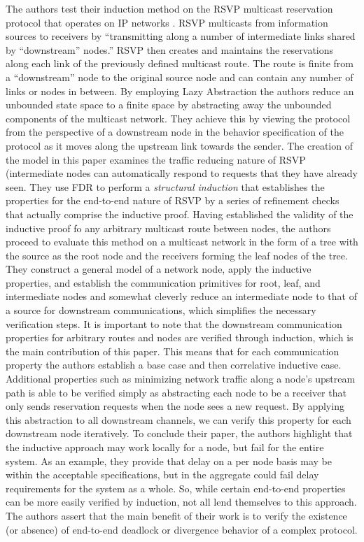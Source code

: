 \documentclass[12pt, fullpage]{article}
\begin{document}
\bigbreak
The authors test their induction method on the RSVP multicast reservation protocol that operates on IP networks \cite{rfc2205}. RSVP multicasts from information sources to receivers by ``transmitting along a number of intermediate links shared by ``downstream'' nodes.'' RSVP then creates and maintains the reservations along each link of the previously defined multicast route. The route is finite from a ``downstream'' node to the original source node and can contain any number of links or nodes in between.
\bigbreak
By employing Lazy Abstraction the authors reduce an unbounded state space to a finite space by abstracting away the unbounded components of the multicast network. They achieve this by viewing the protocol from the perspective of a downstream node in the behavior specification of the protocol as it moves along the upstream link towards the sender.
\bigbreak
The creation of the model in this paper examines the traffic reducing nature of RSVP (intermediate nodes can automatically respond to requests that they have already seen. They use FDR to perform a \textit{structural induction} that establishes the properties for the end-to-end nature of RSVP by a series of refinement checks that actually comprise the inductive proof. Having established the validity of the inductive proof fo any arbitrary multicast route between nodes, the authors proceed to evaluate this method on a multicast network in the form of a tree with the source as the root node and the receivers forming the leaf nodes of the tree. They construct a general model of a network node, apply the inductive properties, and establish the communication primitives for root, leaf, and intermediate nodes and somewhat cleverly reduce an intermediate node to that of a source for downstream communications, which simplifies the necessary verification steps. It is important to note that the downstream communication properties for arbitrary routes and nodes are verified through induction, which is the main contribution of this paper. This means that for each communication property the authors establish a base case and then correlative inductive case. Additional properties such as minimizing network traffic along a node's upstream path is able to be verified simply as abstracting each node to be a receiver that only sends reservation requests when the node sees a new request. By applying this abstraction to all downstream channels, we can verify this property for each downstream node iteratively.
\bigbreak
To conclude their paper, the authors highlight that the inductive approach may work locally for a node, but fail for the entire system. As an example, they provide that delay on a per node basis may be within the acceptable specifications, but in the aggregate could fail delay requirements for the system as a whole. So, while certain end-to-end properties can be more easily verified by induction, not all lend themselves to this approach. The authors assert that the main benefit of their work is to verify the existence (or absence) of end-to-end deadlock or divergence behavior of a complex protocol. 
\bigbreak
\end{document}
